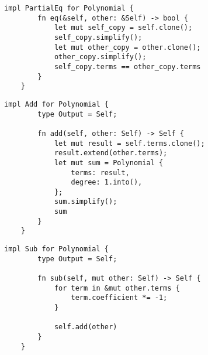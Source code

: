 \begin{lstlisting}[caption={The implementation of \texttt{PartialEq} for the \texttt{Polynomial} struct}, label={lst:polynomial-eq}]
    impl PartialEq for Polynomial {
        fn eq(&self, other: &Self) -> bool {
            let mut self_copy = self.clone();
            self_copy.simplify();
            let mut other_copy = other.clone();
            other_copy.simplify();
            self_copy.terms == other_copy.terms
        }
    }
\end{lstlisting}

\begin{lstlisting}[caption={The implementation of the addition operation for the \texttt{Polynomial} struct}, label={lst:polynomial-add}]
    impl Add for Polynomial {
        type Output = Self;
    
        fn add(self, other: Self) -> Self {
            let mut result = self.terms.clone();
            result.extend(other.terms);
            let mut sum = Polynomial {
                terms: result,
                degree: 1.into(),
            };
            sum.simplify();
            sum
        }
    }        
\end{lstlisting}

\begin{lstlisting}[caption={The implementation of the subtraction operation for the \texttt{Polynomial} struct}, label={lst:polynomial-sub}]
    impl Sub for Polynomial {
        type Output = Self;
    
        fn sub(self, mut other: Self) -> Self {
            for term in &mut other.terms {
                term.coefficient *= -1;
            }
    
            self.add(other)
        }
    }        
\end{lstlisting}

